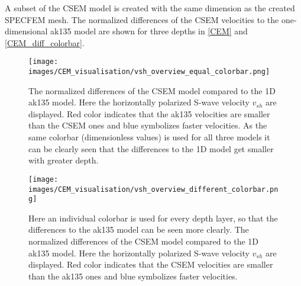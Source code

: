 A subset of the CSEM model is created with the same dimension as the created SPECFEM mesh. 
The normalized differences of the CSEM velocities to the one-dimensional ak135 model \citep{Kennett1995} are shown for three
depths in \autoref{CEM} and \autoref{CEM_diff_colorbar}.

\begin{figure}[h]
\begin{center}
\texttt{[image: images/CEM\_visualisation/vsh\_overview\_equal\_colorbar.png]}
\caption[Differences of CSEM to ak135 (same colorbar).]{The normalized differences of the CSEM model 
\citep{Afanasiev2014} compared to the 1D ak135 model. 
Here the horizontally polarized S-wave velocity $v_{sh}$ are displayed. Red color indicates that the ak135
velocities are smaller than the CSEM ones and blue symbolizes faster velocities.
As the same colorbar (dimensionless values) is used for all three models it can be clearly seen that the differences
to the 1D model get smaller with greater depth. }  
\label{CEM}
\end{center}
\end{figure}

\begin{figure}[h]
\begin{center}
\texttt{[image: images/CEM\_visualisation/vsh\_overview\_different\_colorbar.png]}
\caption[Differences of CSEM to ak135 (individual colorbar).]{Here an individual colorbar is used for 
every depth layer, so that the differences to the 
ak135 model can be seen more clearly. 
The normalized differences of the CSEM model \citep{Afanasiev2014} compared to the 1D ak135 model. 
Here the horizontally polarized S-wave velocity $v_{sh}$ are displayed. Red color indicates that the CSEM
velocities are smaller than the ak135 ones and blue symbolizes faster velocities.}  
\label{CEM_diff_colorbar}
\end{center}
\end{figure}


